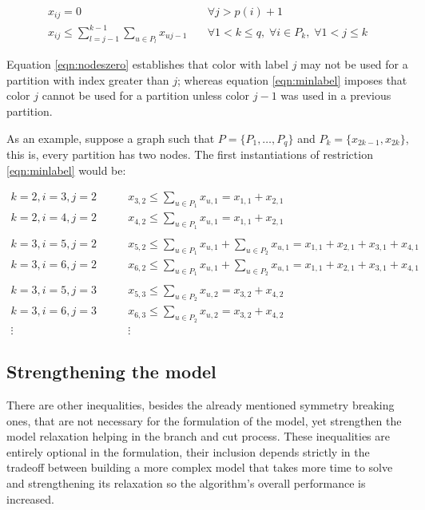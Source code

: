 \begin{align}
x_{ij} = 0 \quad &\forall j > p(i) + 1 \label{eqn:nodeszero} \\
x_{ij} \leq \sum_{l = j-1}^{k-1} \sum_{u \in P_l} x_{uj-1} \quad &\forall 1 < k \leq q, \; \forall i \in P_k, \; \forall 1 < j \leq k \label{eqn:minlabel}
\end{align}

Equation \ref{eqn:nodeszero} establishes that color with label $j$ may not be used for a partition with index greater than $j$; whereas equation \ref{eqn:minlabel} imposes that color $j$ cannot be used for a partition unless color $j-1$ was used in a previous partition.

As an example, suppose a graph such that $P = \{ P_1, \ldots, P_q \}$ and $P_k = \{ x_{2k-1}, x_{2k} \}$, this is, every partition has two nodes. The first instantiations of restriction \ref{eqn:minlabel} would be:

\begin{align*}
k = 2, i = 3, j = 2 \qquad & x_{3,2} \leq \sum_{u \in P_1} x_{u,1} = x_{1,1} + x_{2,1} \\
k = 2, i = 4, j = 2 \qquad & x_{4,2} \leq \sum_{u \in P_1} x_{u,1} = x_{1,1} + x_{2,1} \\
&\\
k = 3, i = 5, j = 2 \qquad & x_{5,2} \leq \sum_{u \in P_1} x_{u,1} + \sum_{u \in P_2} x_{u,1} = x_{1,1} + x_{2,1} + x_{3,1} + x_{4,1} \\
k = 3, i = 6, j = 2 \qquad & x_{6,2} \leq \sum_{u \in P_1} x_{u,1} + \sum_{u \in P_2} x_{u,1} = x_{1,1} + x_{2,1} + x_{3,1} + x_{4,1} \\
&\\
k = 3, i = 5, j = 3 \qquad & x_{5,3} \leq \sum_{u \in P_2} x_{u,2} = x_{3,2} + x_{4,2} \\
k = 3, i = 6, j = 3 \qquad & x_{6,3} \leq \sum_{u \in P_2} x_{u,2} = x_{3,2} + x_{4,2} \\
\vdots \qquad & \vdots
\end{align*}

\subsection{Strengthening the model}

There are other inequalities, besides the already mentioned symmetry breaking ones, that are not necessary for the formulation of the model, yet strengthen the model relaxation helping in the branch and cut process. These inequalities are entirely optional in the formulation, their inclusion depends strictly in the tradeoff between building a more complex model that takes more time to solve and strengthening its relaxation so the algorithm's overall performance is increased.


